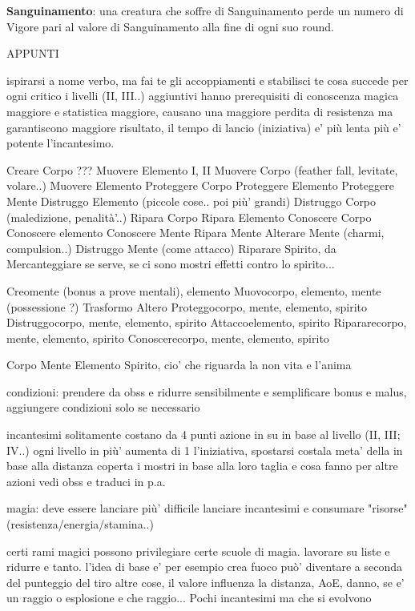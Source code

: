 \documentclass[12pt,a4paper,twoside,openany]{book}
\begin{document}
\textbf{Sanguinamento}: una creatura che soffre di Sanguinamento perde un numero di Vigore pari al valore di Sanguinamento alla fine di ogni suo round.

\pagebreak
\pagebreak


APPUNTI
\pagebreak
\pagebreak



ispirarsi a nome verbo, ma fai te gli accoppiamenti e stabilisci te cosa succede per ogni critico 
i livelli (II, III..) aggiuntivi hanno prerequisiti di conoscenza magica maggiore e statistica maggiore, causano una maggiore perdita di resistenza ma garantiscono maggiore risultato, il tempo di lancio (iniziativa) e' più lenta più e' potente l'incantesimo.

Creare Corpo  ???
Muovere Elemento I, II
Muovere Corpo (feather fall, levitate, volare..)
Muovere Elemento
Proteggere Corpo
Proteggere Elemento 
Proteggere Mente
Distruggo Elemento (piccole cose.. poi più' grandi)
Distruggo Corpo (maledizione, penalità'..)
Ripara Corpo
Ripara Elemento
Conoscere Corpo
Conoscere elemento
Conoscere Mente
Ripara Mente
Alterare Mente (charmi, compulsion..)
Distruggo Mente (come attacco)
Riparare Spirito, da Mercanteggiare se serve, se ci sono mostri effetti contro lo spirito...


Creomente (bonus a prove mentali), elemento
Muovocorpo, elemento, mente (possessione ?)
Trasformo
Altero
Proteggocorpo, mente, elemento, spirito
Distruggocorpo, mente, elemento, spirito
Attaccoelemento, spirito
Ripararecorpo, mente, elemento, spirito
Conoscerecorpo, mente, elemento, spirito

Corpo
Mente
Elemento
Spirito, cio' che riguarda la non vita e l'anima






condizioni: prendere da obss e ridurre sensibilmente  e semplificare bonus e malus, aggiungere condizioni solo se necessario

incantesimi solitamente costano da 4 punti azione in su in base  al livello (II, III; IV..) ogni livello in più' aumenta di 1 l'iniziativa, spostarsi costala meta' della in base alla distanza coperta
i mostri in base alla loro taglia e cosa fanno
per altre azioni vedi obss e traduci in p.a.

magia: deve essere lanciare più' difficile lanciare incantesimi e consumare "risorse" (resistenza/energia/stamina..)

certi rami magici possono privilegiare certe scuole di magia. lavorare su liste e ridurre e tanto. l'idea di base e' per esempio crea fuoco può' diventare a seconda del punteggio del tiro altre cose, il valore influenza la distanza, AoE, danno, se e' un raggio o esplosione e che raggio...  Pochi incantesimi ma che si evolvono
\end{document}
